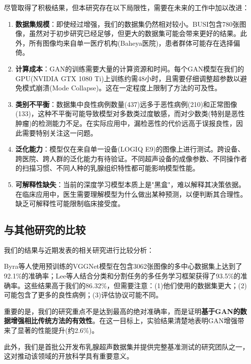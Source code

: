 \documentclass[supercite]{../Hust-undergraduate-translation/Experimental_Report}
\theoremstyle{definition}
\begin{document}
尽管取得了积极结果，但本研究存在以下局限性，需要在未来的工作中加以改进：

\begin{enumerate}
\item \textbf{数据集规模}：即使经过增强，我们的数据集仍然相对较小。BUSI包含780张图像，虽然对于初步研究已经足够，但更大的数据集可能会带来更好的结果。此外，所有图像均来自单一医疗机构(Baheya医院)，患者群体可能存在选择偏倚。

\item \textbf{计算成本}：GAN的训练需要大量的计算资源和时间。每个GAN模型在我们的GPU(NVIDIA GTX 1080 Ti)上训练约需48小时，且需要仔细调整超参数以避免模式崩溃(Mode Collapse)。这在一定程度上限制了方法的可及性。

\item \textbf{类别不平衡}：数据集中良性病例数量(437)远多于恶性病例(210)和正常图像(133)，这种不平衡可能导致模型对多数类过度敏感，而对少数类(特别是恶性肿瘤)的检测能力不足。在实际应用中，漏检恶性的代价远高于误报良性，因此需要特别关注这一问题。

\item \textbf{泛化能力}：模型仅在来自单一设备(LOGIQ E9)的图像上进行测试。跨设备、跨医院、跨人群的泛化能力有待验证。不同超声设备的成像参数、不同操作者的扫描习惯、不同人种的乳腺组织特性都可能影响模型性能。

\item \textbf{可解释性缺失}：当前的深度学习模型本质上是"黑盒"，难以解释其决策依据。在临床应用中，医生需要理解模型为什么做出某种预测，以便判断其合理性。缺乏可解释性可能限制临床接受度。
\end{enumerate}

\subsection{与其他研究的比较}

我们的结果与近期发表的相关研究进行比较分析：

Byra等人使用预训练的VGGNet模型在包含3062张图像的多中心数据集上达到了92.1\%的准确率；Lee等人结合分类和分割任务的多任务学习框架获得了93.5\%的准确率。这些结果高于我们的86.32\%，但需要注意：(1)他们使用的数据集更大；(2)可能包含了更多的良性病例；(3)评估协议可能不同。

重要的是，我们的研究重点不是达到最高的绝对准确率，而是证明\textbf{基于GAN的数据增强相比传统方法的有效性}。在这一目标上，实验结果清楚地表明GAN增强带来了显著的性能提升(约2.6\%)。

此外，我们是首批公开发布乳腺超声数据集并提供完整基准测试的研究团队之一，这对推动该领域的开放科学具有重要意义。
\end{document}
